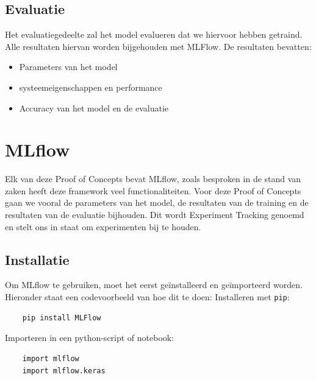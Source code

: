 \subsection{Evaluatie}
Het evaluatiegedeelte zal het model evalueren dat we hiervoor hebben getraind. Alle resultaten hiervan worden bijgehouden met MLFlow. De resultaten bevatten:
\begin{itemize}
    \item Parameters van het model
    \item systeemeigenschappen en performance
    \item Accuracy van het model en de evaluatie
\end{itemize}

\section{MLflow}
Elk van deze Proof of Concepts bevat MLflow, zoals besproken in de stand van zaken heeft deze framework veel functionaliteiten. Voor deze Proof of Concepts gaan we vooral de parameters van het model, de resultaten van de training en de resultaten van de evaluatie bijhouden. Dit wordt Experiment Tracking genoemd en stelt ons in staat om experimenten bij te houden.
\subsection{Installatie}
Om MLflow te gebruiken, moet het eerst geïnstalleerd en geïmporteerd worden. Hieronder staat een codevoorbeeld van hoe dit te doen:
Installeren met \verb+pip+:
\begin{verbatim}
    pip install MLFlow
\end{verbatim}
Importeren in een python-script of notebook:
\begin{verbatim}
    import mlflow
    import mlflow.keras
\end{verbatim}

